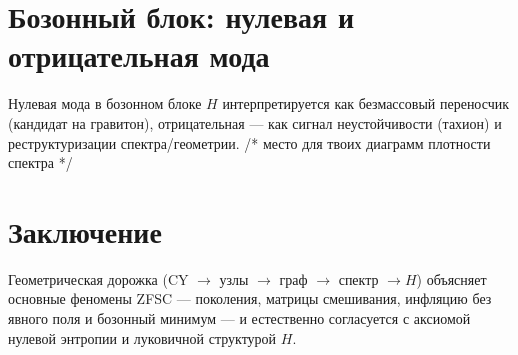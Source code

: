 \documentclass[12pt,a4paper]{article}
\begin{document}
\section{Бозонный блок: нулевая и отрицательная мода}
Нулевая мода в бозонном блоке $H$ интерпретируется как безмассовый переносчик (кандидат на гравитон), 
отрицательная — как сигнал неустойчивости (тахион) и реструктуризации спектра/геометрии.
/* место для твоих диаграмм плотности спектра */

\section{Заключение}
Геометрическая дорожка (CY $\to$ узлы $\to$ граф $\to$ спектр $\to H$) объясняет 
основные феномены ZFSC — поколения, матрицы смешивания, инфляцию без явного поля и бозонный минимум — 
и естественно согласуется с аксиомой нулевой энтропии и луковичной структурой $H$.
\end{document}
